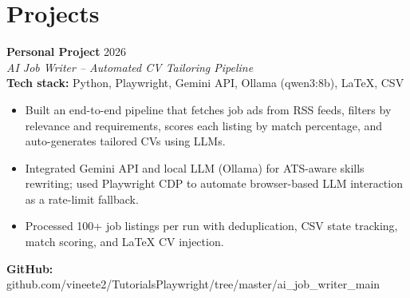 \documentclass[10pt]{article}   %
\begin{document}
\begin{minipage}[t]{0.67\textwidth}

\section*{Projects}
\textbf{Personal Project} \hfill 2026 \\
\textit{AI Job Writer -- Automated CV Tailoring Pipeline} \\
\textbf{Tech stack:} Python, Playwright, Gemini API, Ollama (qwen3:8b), LaTeX, CSV
\begin{itemize}[leftmargin=*, topsep=2pt, itemsep=1pt, parsep=0pt]
\item Built an end-to-end pipeline that fetches job ads from RSS feeds, filters by relevance and requirements, scores each listing by match percentage, and auto-generates tailored CVs using LLMs.
\item Integrated Gemini API and local LLM (Ollama) for ATS-aware skills rewriting; used Playwright CDP to automate browser-based LLM interaction as a rate-limit fallback.
\item Processed 100+ job listings per run with deduplication, CSV state tracking, match scoring, and LaTeX CV injection.
\end{itemize}
\textbf{GitHub:} github.com/vineete2/TutorialsPlaywright/tree/master/ai\_job\_writer\_main\\


\end{minipage}
\end{document}
